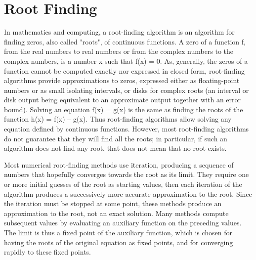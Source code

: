 \documentclass{article}
\begin{document}
\section{Root Finding}
In mathematics and computing, a root-finding algorithm is an algorithm for finding zeros, also called "roots", of continuous functions. A zero of a function f, from the real numbers to real numbers or from the complex numbers to the complex numbers, is a number x such that f(x) = 0. As, generally, the zeros of a function cannot be computed exactly nor expressed in closed form, root-finding algorithms provide approximations to zeros, expressed either as floating-point numbers or as small isolating intervals, or disks for complex roots (an interval or disk output being equivalent to an approximate output together with an error bound). \cite{press1992root}
Solving an equation f(x) = g(x) is the same as finding the roots of the function h(x) = f(x) – g(x). Thus root-finding algorithms allow solving any equation defined by continuous functions. However, most root-finding algorithms do not guarantee that they will find all the roots; in particular, if such an algorithm does not find any root, that does not mean that no root exists.\cite{press1992root}

Most numerical root-finding methods use iteration, producing a sequence of numbers that hopefully converges towards the root as its limit. They require one or more initial guesses of the root as starting values, then each iteration of the algorithm produces a successively more accurate approximation to the root. Since the iteration must be stopped at some point, these methods produce an approximation to the root, not an exact solution. Many methods compute subsequent values by evaluating an auxiliary function on the preceding values. The limit is thus a fixed point of the auxiliary function, which is chosen for having the roots of the original equation as fixed points, and for converging rapidly to these fixed points.
\end{document}
